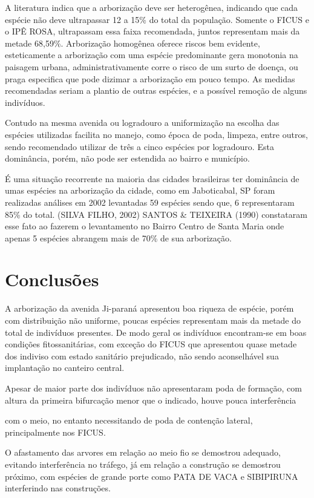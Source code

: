 \documentclass[article,12pt,onesidea,4paper,english,brazil]{abntex2}
\begin{document}
A literatura indica que a arborização deve ser heterogênea, indicando que cada espécie não deve ultrapassar 12 a 15\% do total da população. Somente o FICUS e o IPÊ ROSA, ultrapassam essa faixa recomendada, juntos representam mais da metade 68,59\%. Arborização homogênea oferece riscos bem evidente, esteticamente a arborização com uma espécie predominante gera monotonia na paisagem urbana, administrativamente corre o risco de um surto de doença, ou praga especifica que pode dizimar a arborização em pouco tempo. As medidas recomendadas seriam a plantio de outras espécies, e a possível remoção de alguns indivíduos.

Contudo na mesma avenida ou logradouro a uniformização na escolha das espécies utilizadas facilita no manejo, como época de poda, limpeza, entre outros, sendo recomendado utilizar de três a cinco espécies por logradouro. Esta dominância, porém, não pode ser estendida ao bairro e município.

É uma situação recorrente na maioria das cidades brasileiras ter dominância de umas espécies na arborização da cidade, como em Jaboticabal, SP foram realizadas análises em 2002 levantadas 59 espécies sendo que, 6 representaram 85\% do total. (SILVA FILHO, 2002) SANTOS \& TEIXEIRA (1990) constataram esse fato ao fazerem o levantamento no Bairro Centro de Santa Maria onde apenas 5 espécies abrangem mais de 70\% de sua arborização.
	
	\section*{Conclusões}
	
	A arborização da avenida Ji-paraná apresentou boa riqueza de espécie, porém com distribuição não uniforme, poucas espécies representam mais da metade do total de indivíduos presentes. De modo geral os indivíduos encontram-se em boas condições fitossanitárias, com exceção do FICUS que apresentou quase metade dos indiviso com estado sanitário prejudicado, não sendo aconselhável sua implantação no canteiro central.
	
	Apesar de maior parte dos indivíduos não apresentaram poda de formação, com altura da primeira bifurcação menor que o indicado, houve pouca interferência
	
	com o meio, no entanto necessitando de poda de contenção lateral, principalmente nos FICUS.
	
	O afastamento das arvores em relação ao meio fio se demostrou adequado, evitando interferência no tráfego, já em relação a construção se demostrou próximo, com espécies de grande porte como PATA DE VACA e SIBIPIRUNA interferindo nas construções.
	
\end{document}
